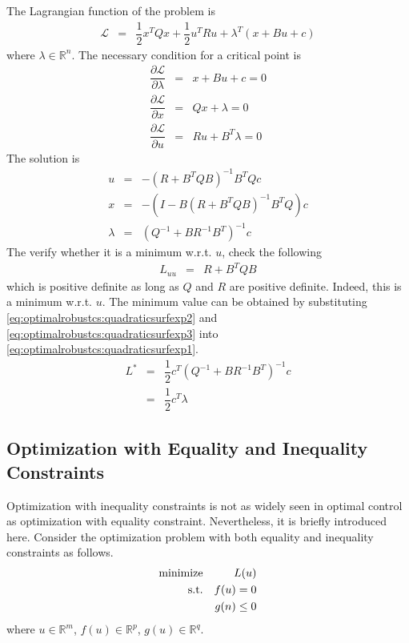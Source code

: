 The Lagrangian function of the problem is
\begin{eqnarray}
  \mathcal{L} &=& \dfrac{1}{2}x^TQx + \dfrac{1}{2}u^TRu + \lambda^T(x + Bu + c) \nonumber
\end{eqnarray}
where $\lambda \in\mathbb{R}^n$. The necessary condition for a critical point is
\begin{eqnarray}
  \dfrac{\partial \mathcal{L}}{\partial \lambda} &=& x + Bu + c = 0 \\
  \dfrac{\partial \mathcal{L}}{\partial x} &=& Qx + \lambda = 0 \\
  \dfrac{\partial \mathcal{L}}{\partial u} &=& Ru + B^T\lambda = 0 \nonumber
\end{eqnarray}
The solution is
\begin{eqnarray}
  u &=& -\left(R+B^TQB\right)^{-1}B^TQc \label{eq:optimalrobustcs:quadraticsurfexp2} \\
  x &=& -\left(I-B\left(R+B^TQB\right)^{-1}B^TQ\right)c \label{eq:optimalrobustcs:quadraticsurfexp3} \\
  \lambda &=& \left(Q^{-1}+BR^{-1}B^T\right)^{-1}c \nonumber
\end{eqnarray}
The verify whether it is a minimum w.r.t. $u$, check the following
\begin{eqnarray}
  L_{uu} &=& R+B^TQB \nonumber
\end{eqnarray}
which is positive definite as long as $Q$ and $R$ are positive definite. Indeed, this is a minimum w.r.t. $u$. The minimum value can be obtained by substituting \eqref{eq:optimalrobustcs:quadraticsurfexp2} and \eqref{eq:optimalrobustcs:quadraticsurfexp3} into \eqref{eq:optimalrobustcs:quadraticsurfexp1}.
\begin{eqnarray}
  L^* &=& \dfrac{1}{2}c^T\left(Q^{-1}+BR^{-1}B^T\right)^{-1}c \nonumber \\
  &=& \dfrac{1}{2}c^T\lambda \nonumber
\end{eqnarray}

\subsection{Optimization with Equality and Inequality Constraints}

Optimization with inequality constraints is not as widely seen in optimal control as optimization with equality constraint. Nevertheless, it is briefly introduced here. Consider the optimization problem with both equality and inequality constraints as follows.
\begin{eqnarray}
	\textup{minimize} && L(u) \nonumber \\
	\textup{s.t.} && f(u) = 0 \nonumber \\
    && g(n) \leq 0 \label{eq:optimalrobustcs:inequalityconstraint2}
\end{eqnarray}
where $u\in\mathbb{R}^m$, $f(u)\in\mathbb{R}^p$, $g(u)\in\mathbb{R}^q$.

